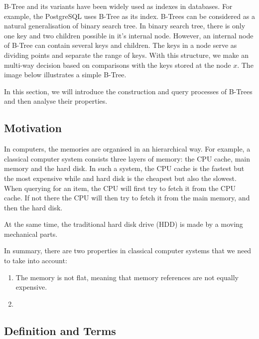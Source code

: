 B-Tree and its variants have been widely used as indexes in
databases. For example, the PostgreSQL uses B-Tree as its index. B-Trees
can be considered as a natural generalisation of binary search tree. In
binary search tree, there is only one key and two children possible in
it's internal node. However, an internal node of B-Tree can contain
several keys and children. The keys in a node serve as dividing points
and separate the range of keys. With this structure, we make an
multi-way decision based on comparisons with the keys stored at the node
\(x\). The image below illustrates a simple B-Tree.

In this section, we will introduce the construction and query processes
of B-Trees and then analyse their properties.

\subsection{Motivation}

In computers, the memories are organised in an hierarchical way. For example, a classical computer system consists three layers of memory: the CPU cache, main memory and the hard disk. In such a system, the CPU cache is the fastest but the most expensive while and hard disk is the cheapest but also the slowest. When querying for an item, the CPU will first try to fetch it from the CPU cache. If not there the CPU will then try to fetch it from the main memory, and then the hard disk.


At the same time, the traditional hard disk drive (HDD) is made by a moving mechanical parts.



In summary, there are two properties in classical computer systems that we need to take into account:

\begin{enumerate}
	\item The memory is not flat, meaning that memory references are not equally expensive. 
	\item 
\end{enumerate}

\subsection{Definition and Terms}

